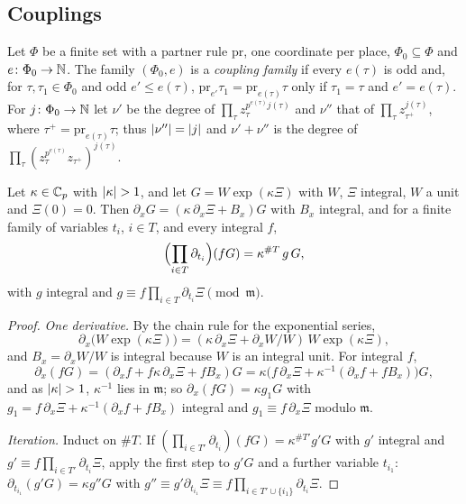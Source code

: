 \subsection{Couplings}\label{ss:sharp-couplings}
Let $\Phi$ be a finite set with a partner rule $\mathrm{pr}$, one coordinate per place, $\Phi_0\subseteq
\Phi$ and $e\colon\Phi_0\to\mathbb{N}$. The family $(\Phi_0,e)$ is a \emph{coupling family} if every $e(\tau)$ is
odd and, for $\tau,\tau_1\in\Phi_0$ and odd $e'\le e(\tau)$, $\mathrm{pr}_{e'}\tau_1=\mathrm{pr}_{e(\tau)}\tau$
only if $\tau_1=\tau$ and $e'=e(\tau)$. For $j\colon\Phi_0\to\mathbb{N}$ let $\nu'$ be the degree of
$\prod_\tau z_\tau^{p^{e(\tau)}j(\tau)}$ and $\nu''$ that of $\prod_\tau z_{\tau^+}^{j(\tau)}$, where
$\tau^+=\mathrm{pr}_{e(\tau)}\tau$; thus $\lvert \nu''\rvert=\lvert j\rvert$ and $\nu'+\nu''$ is the degree of
$\prod_\tau(z_\tau^{p^{e(\tau)}}z_{\tau^+})^{j(\tau)}$.

\begin{lemma}\label{lem:kappa-derivatives}
Let $\kappa\in\mathbb{C}_p$ with $\lvert \kappa\rvert>1$, and let $G=W\exp(\kappa\Xi)$ with $W$, $\Xi$ integral, $W$ a unit and
$\Xi(0)=0$. Then $\partial_xG=(\kappa\,\partial_x\Xi+B_x)G$ with $B_x$ integral, and for a finite family
of variables $t_i$, $i\in T$, and every integral $f$,
\[
  \Bigl(\prod_{i\in T}\partial_{t_i}\Bigr)(fG)=\kappa^{\#T}\,g\,G,
\]
with $g$ integral and $g\equiv f\prod_{i\in T}\partial_{t_i}\Xi\pmod{\mathfrak m}$.
\end{lemma}

\begin{proof}
\emph{One derivative.} By the chain rule for the exponential series,
\[
  \partial_x\bigl(W\exp(\kappa\Xi)\bigr)=(\kappa\,\partial_x\Xi+\partial_xW/W)\,W\exp(\kappa\Xi),
\]
and $B_x=\partial_xW/W$ is integral because $W$ is an integral unit. For integral $f$,
\[
  \partial_x(fG)=(\partial_xf+f\kappa\,\partial_x\Xi+fB_x)G=\kappa\bigl(f\,\partial_x\Xi+\kappa^{-1}(\partial_xf+fB_x)\bigr)G ,
\]
and as $\lvert \kappa\rvert>1$, $\kappa^{-1}$ lies in $\mathfrak m$; so $\partial_x(fG)=\kappa g_1G$ with $g_1=f\,\partial_x\Xi+\kappa^{-1}(\partial_xf+fB_x)$ integral and $g_1\equiv f\,\partial_x\Xi$ modulo $\mathfrak m$.

\emph{Iteration.} Induct on $\#T$. If $(\prod_{i\in T'}\partial_{t_i})(fG)=\kappa^{\#T'}g'G$ with $g'$ integral and $g'\equiv f\prod_{i\in T'}\partial_{t_i}\Xi$, apply the first step to $g'G$ and a further variable $t_{i_1}$: $\partial_{t_{i_1}}(g'G)=\kappa g''G$ with $g''\equiv g'\partial_{t_{i_1}}\Xi\equiv f\prod_{i\in T'\cup\{i_1\}}\partial_{t_i}\Xi$.
\end{proof}

